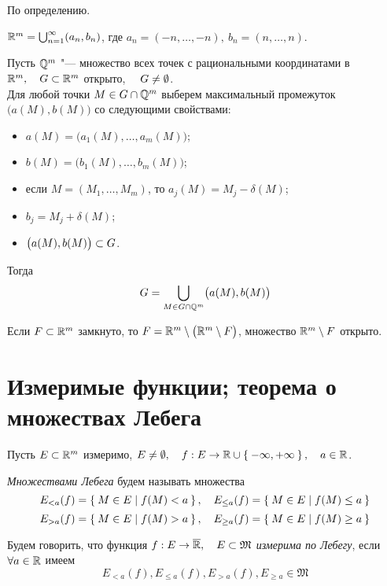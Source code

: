 \begin{eproof}
	\item По определению.

	\item $ \mathbb{R}^m = \bigcup_{n = 1}^\infty (a_n, b_n) $, где $ a_n = (-n, \dots, -n), ~ b_n = (n, \dots, n) $.

	\item Пусть $ \mathbb{Q}^m $ "--- множество всех точек с рациональными координатами в $ \mathbb{R}^m, \quad G \subset \mathbb{R}^m $ открыто, $ \quad G \ne \emptyset $. \\
		Для любой точки $ M \in G \cap \mathbb{Q}^m $ выберем максимальный промежуток $ \bigl( a(M), b(M) \bigr) $ со следующими свойствами:
		\begin{itemize}
			\item $ a(M) = \bigl( a_1(M), \dots, a_m(M) \bigr) $;
			\item $ b(M) = \bigl( b_1(M), \dots, b_m(M) \bigr) $;
			\item если $ M = (M_1, \dots, M_m) $, то $ a_j(M) = M_j - \delta(M) $;
			\item $ b_j = M_j + \delta(M) $;
			\item $ \bigl( a(M), b(M) \bigr) \subset G $.
		\end{itemize}
		Тогда
		$$ G = \bigcup_{M \in G \cap \mathbb{Q}^m} \bigl( a(M), b(M) \bigr) $$

	\item Если $ F \subset \mathbb{R}^m $ замкнуто, то $ F = \mathbb{R}^m \setminus \bigl( \mathbb{R}^m \setminus F \bigr) $, множество $ \mathbb{R}^m \setminus F $ открыто.
\end{eproof}

\section{Измеримые функции; теорема о множествах Лебега}

\begin{definition}
	Пусть $ E \subset \mathbb{R}^m $ измеримо, $ E \ne \emptyset, \quad f : E \to \mathbb{R} \cup \Set{-\infty, +\infty}, \quad a \in \mathbb{R} $.

	\emph{Множествами Лебега} будем называть множества
	$$ E_{<a}(f) = \Set{M \in E \mid f(M) < a}, \quad E_{\le a}(f) = \Set{M \in E \mid f(M) \le a} $$
	$$ E_{>a}(f) = \Set{M \in E \mid f(M) > a}, \quad E_{\ge a}(f) = \Set{M \in E \mid f(M) \ge a} $$
\end{definition}

\begin{definition}
	Будем говорить, что функция $ f : E \to \overline {\mathbb{R}}, \quad E \subset \mathfrak M $ \emph{измерима по Лебегу}, если $ \forall a \in \mathbb{R} $ имеем
	$$ E_{<a}(f), E_{\le a}(f), E_{>a}(f), E_{\ge a} \in \mathfrak M $$
\end{definition}

